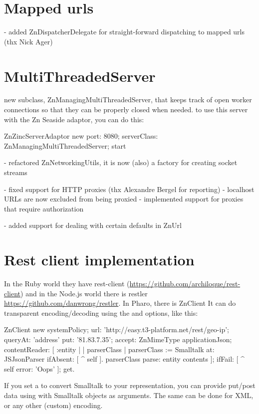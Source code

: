 \documentclass[a4paper,10pt,twoside]{book}
\begin{document}
\section{Mapped urls}
- added ZnDispatcherDelegate for straight-forward dispatching to mapped urls (thx Nick Ager)


\section{MultiThreadedServer}      
new subclass, ZnManagingMultiThreadedServer, that keeps track of open
worker connections so that they can be properly closed when needed.
to use this server with the Zn Seaside adaptor, you can do this:

    ZnZincServerAdaptor new
      port: 8080;
      serverClass: ZnManagingMultiThreadedServer;
      start
      
- refactored ZnNetworkingUtils, it is now (also) a factory for creating socket streams


- fixed support for HTTP proxies (thx Alexandre Bergel for reporting)
- localhost URLs are now excluded from being proxied
- implemented support for proxies that require authorization

- added support for dealing with certain defaults in ZnUrl


\section{Rest client implementation}
In the Ruby world they have rest-client (\url{https://github.com/archiloque/rest-client}) and in
the Node.js world there is restler \url{https://github.com/danwrong/restler}. In Pharo, there is ZnClient
It can do transparent encoding/decoding using the  and  options, like this:

\begin{code}
ZnClient new
	systemPolicy;
	url: 'http://easy.t3-platform.net/rest/geo-ip';
	queryAt: 'address' put: '81.83.7.35';
	accept: ZnMimeType applicationJson;
	contentReader: [ :entity | | parserClass |
		parserClass := Smalltalk at:  JSJsonParser ifAbsent: [ ^ self ].
		parserClass parse: entity contents ];
	ifFail: [ ^ self error: 'Oops' ];
	get.
\end{code}	

If you set a  to convert Smalltalk to your representation, you can provide put/post data using  with Smalltalk objects as arguments. The same can be done for XML, or any other (custom) encoding.
\end{document}
